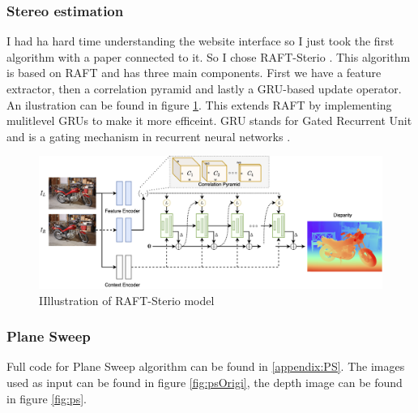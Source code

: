 \documentclass{article}
\begin{document}
    \subsubsection{Stereo estimation}
    I had ha hard time understanding the website interface so I just took the first
    algorithm with a paper connected to it. So I chose RAFT-Sterio \cite{lipson2021raft}.
    This algorithm is based on RAFT \cite{teed2020raft} and has three main components.
    First we have a feature extractor, then a correlation pyramid and lastly a GRU-based
    update operator. An ilustration can be found in figure \ref{fig:raft}. This extends
    RAFT by implementing mulitlevel GRUs to make it more efficeint.
    GRU stands for Gated Recurrent Unit and is a gating mechanism in recurrent neural networks \cite{wikipedia_2021}.

    \begin{figure}[H]
        \includegraphics[width=1\textwidth]{RAFTStereo.png}
        \caption{IIllustration of RAFT-Sterio model\cite{lipson2021raft}}
        \label{fig:raft}
    \end{figure}
    \subsubsection{Plane Sweep}
    Full code for Plane Sweep algorithm can be found in \ref{appendix:PS}. The images used as input can be found in figure \ref{fig:psOrigi},
    the depth image can be found in figure \ref{fig:ps}.
    
\end{document}
